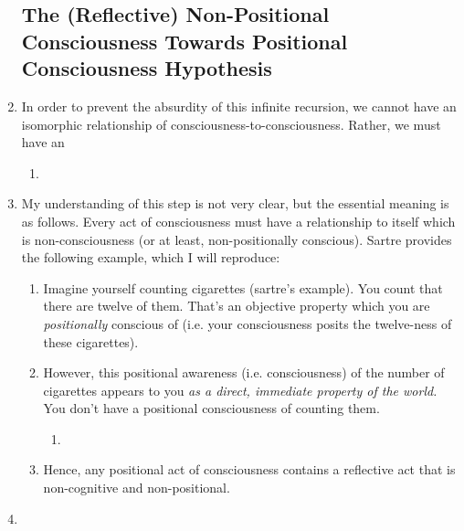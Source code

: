 \begin{enumerate}
  \subsection{The (Reflective) Non-Positional Consciousness Towards Positional Consciousness Hypothesis}
  \item In order to prevent the absurdity of this infinite recursion, we cannot have an isomorphic relationship of consciousness-to-consciousness. Rather, we must have an 
  \begin{enumerate}
    \item {}
  \end{enumerate}
  \item My understanding of this step is not very clear, but the essential meaning is as follows. Every act of consciousness must have a relationship to itself which is non-consciousness (or at least, non-positionally conscious). Sartre provides the following example, which I will reproduce:
  \begin{enumerate}
    \item Imagine yourself counting cigarettes (sartre's example). You count that there are twelve of them. That's an objective property which you are \emph{positionally} conscious of (i.e. your consciousness posits the twelve-ness of these cigarettes).
    \item However, this positional awareness (i.e. consciousness) of the number of cigarettes appears to you \emph{as a direct, immediate property of the world.} You don't have a positional consciousness of counting them.
    \begin{enumerate}
      \item {}
    \end{enumerate}
    \item Hence, any positional act of consciousness contains a reflective act that is non-cognitive and non-positional.
  \end{enumerate}
  \item {}

\end{enumerate}
